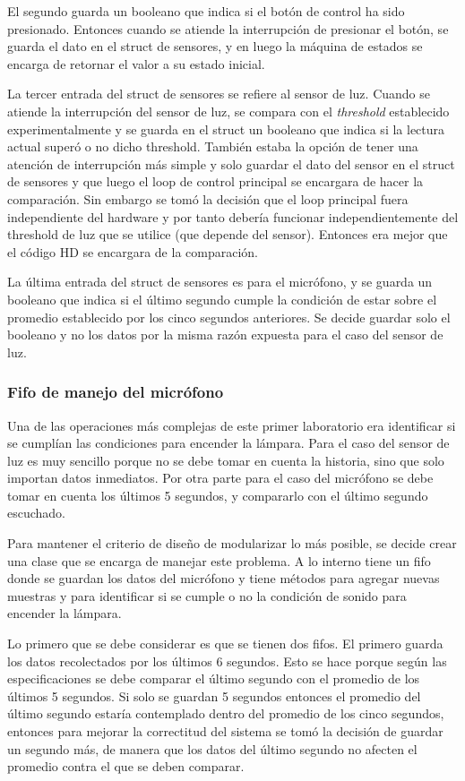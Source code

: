 El segundo guarda un booleano que indica si el botón de control ha sido presionado. Entonces cuando
se atiende la interrupción de presionar el botón, se guarda el dato en el struct de sensores, y
en luego la máquina de estados se encarga de retornar el valor a su estado inicial.

La tercer entrada del struct de sensores se refiere al sensor de luz. Cuando se atiende la
interrupción del sensor de luz, se compara con el \textit{threshold} establecido experimentalmente y
se guarda en el struct un booleano que indica si la lectura actual superó o no dicho
threshold. También estaba la opción de tener una atención de interrupción más simple y solo guardar
el dato del sensor en el struct de sensores y que luego el loop de control principal se encargara de
hacer la comparación. Sin embargo se tomó la decisión que el loop principal fuera independiente del
hardware y por tanto debería funcionar independientemente del threshold de luz que se utilice (que
depende del sensor). Entonces era mejor que el código HD se encargara de la comparación.

La última entrada del struct de sensores es para el micrófono, y se guarda un booleano que indica si
el último segundo cumple la condición de estar sobre el promedio establecido por los cinco segundos
anteriores. Se decide guardar solo el booleano y no los datos por la misma razón expuesta para el
caso del sensor de luz.

\subsubsection{Fifo de manejo del micrófono}

Una de las operaciones más complejas de este primer laboratorio era identificar si se cumplían las
condiciones para encender la lámpara. Para el caso del sensor de luz es muy sencillo porque no se
debe tomar en cuenta la historia, sino que solo importan datos inmediatos. Por otra parte para el
caso del micrófono se debe tomar en cuenta los últimos 5 segundos, y compararlo con el último
segundo escuchado.

Para mantener el criterio de diseño de modularizar lo más posible, se decide crear una clase que se
encarga de manejar este problema. A lo interno tiene un fifo donde se guardan los datos del
micrófono y tiene métodos para agregar nuevas muestras y para identificar si se cumple o no la
condición de sonido para encender la lámpara.

Lo primero que se debe considerar es que se tienen dos fifos. El primero guarda los datos
recolectados por los últimos 6 segundos. Esto se hace porque según las especificaciones se debe
comparar el último segundo con el promedio de los últimos 5 segundos. Si solo se guardan 5 segundos
entonces el promedio del último segundo estaría contemplado dentro del promedio de los cinco
segundos, entonces para mejorar la correctitud del sistema se tomó la decisión de guardar un segundo
más, de manera que los datos del último segundo no afecten el promedio contra el que se deben
comparar.

